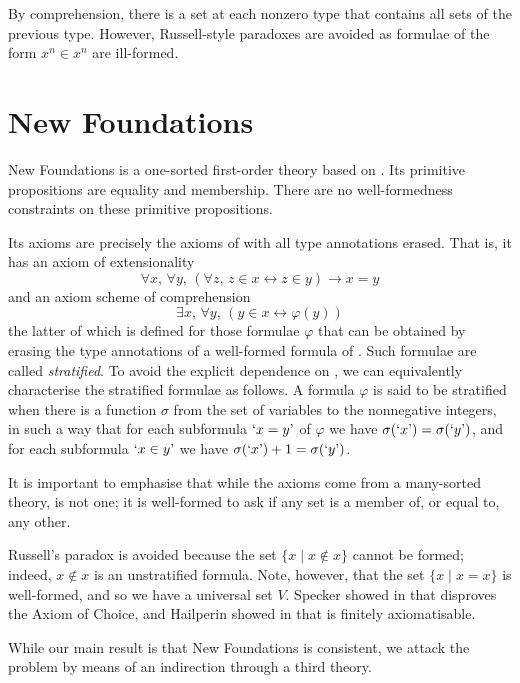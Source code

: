 By comprehension, there is a set at each nonzero type that contains all sets of the previous type.
However, Russell-style paradoxes are avoided as formulae of the form \( x^n \in x^n \) are ill-formed.

\section{New Foundations}

New Foundations is a one-sorted first-order theory based on {\TST}.
Its primitive propositions are equality and membership.
There are no well-formedness constraints on these primitive propositions.

Its axioms are precisely the axioms of {\TST} with all type annotations erased.
That is, it has an axiom of extensionality
\[ \forall x,\, \forall y,\, (\forall z,\, z \in x \leftrightarrow z \in y) \to x = y \]
and an axiom scheme of comprehension
\[ \exists x,\, \forall y,\, (y \in x \leftrightarrow \varphi(y)) \]
the latter of which is defined for those formulae \( \varphi \) that can be obtained by erasing the type annotations of a well-formed formula of {\TST}.
Such formulae are called \emph{stratified}.
To avoid the explicit dependence on {\TST}, we can equivalently characterise the stratified formulae as follows.
A formula \( \varphi \) is said to be stratified when there is a function \( \sigma \) from the set of variables to the nonnegative integers, in such a way that for each subformula \( \mquote{x = y} \) of \( \varphi \) we have \( \sigma(\mquote{x}) = \sigma(\mquote{y}) \), and for each subformula \( \mquote{x \in y} \) we have \( \sigma(\mquote{x}) + 1 = \sigma(\mquote{y}) \).

It is important to emphasise that while the axioms come from a many-sorted theory, {\NF} is not one; it is well-formed to ask if any set is a member of, or equal to, any other.

Russell's paradox is avoided because the set \( \{ x \mid x \notin x \} \) cannot be formed; indeed, \( x \notin x \) is an unstratified formula.
Note, however, that the set \( \{ x \mid x = x \} \) is well-formed, and so we have a universal set \( V \).
Specker showed in \cite{specker-choice-nf} that {\NF} disproves the Axiom of Choice, and Hailperin showed in \cite{hailperin-finite-axiomatisation} that {\NF} is finitely axiomatisable.

While our main result is that New Foundations is consistent, we attack the problem by means of an indirection through a third theory.

